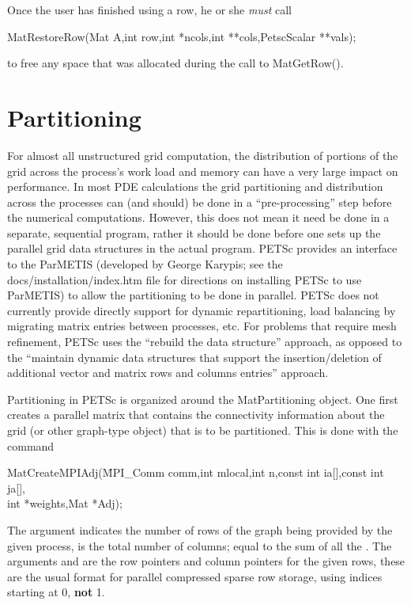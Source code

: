 Once the user has finished using a row, he or she {\em must} call 
\begin{tabbing}
  MatRestoreRow(Mat A,int row,int *ncols,int **cols,PetscScalar **vals);
\end{tabbing}
to free any space that was allocated during the call to MatGetRow().

\section{Partitioning}
\label{sec_partitioning}  

For almost all unstructured grid computation, the distribution of portions of 
the grid across the process's work load and memory can have a very large
impact on performance. In most PDE calculations the grid partitioning and 
distribution across the processes can (and should) be done in a ``pre-processing'' step
before the numerical computations. However, this does not mean it need be done
in a separate, sequential program, rather it should be done before one sets up the 
parallel grid data structures in the actual program. PETSc provides an interface to
the ParMETIS (developed by George Karypis; see the docs/installation/index.htm file
for directions on installing PETSc to use ParMETIS) to allow the partitioning to be done in
parallel. PETSc does not currently provide directly support for dynamic
repartitioning, load balancing by migrating matrix entries between processes, etc.
For problems that require mesh refinement, PETSc uses the ``rebuild the data structure''
approach, as opposed to the ``maintain dynamic data structures that support the 
insertion/deletion of additional vector and matrix rows and columns entries'' approach.

Partitioning in PETSc is organized around the MatPartitioning object. 
One first creates a parallel matrix that contains the connectivity information about the 
grid (or other graph-type object) that is to be partitioned. This is done with the 
command
\begin{tabbing}
 MatCreateMPIAdj(\=MPI\_Comm comm,int mlocal,int n,const int ia[],const int ja[],\\
                 \>        int *weights,Mat *Adj);
\end{tabbing}
The argument  indicates the number of rows of the graph being provided
by the given process,  is the total number of columns; equal to the 
sum of all the . The arguments  and  are the row pointers
and column pointers for the given rows, these are the usual format for parallel 
compressed sparse row storage, using indices starting at 0, {\bf not} 1.

